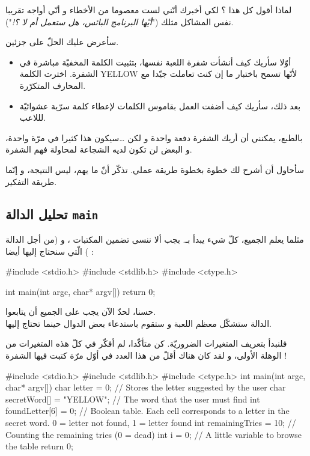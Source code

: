 لماذا أقول كل هذا ؟ لكي أخبرك أنّني لست معصوما من الأخطاء و أنّي أواجه تقريبا نفس المشاكل مثلك
("\textit{أيّها البرنامج البائس، هل ستعمل أم لا ؟!}").

سأعرض عليك الحلّ على جزئين.

\begin{itemize}
  \item أوّلا سأريك كيف أنشأت شفرة اللعبة نفسها، بتثبيت الكلمة المخفيّة مباشرة في الشفرة. اخترت الكلمة
\textenglish{YELLOW}
لأنّها تسمح باختبار ما إن كنت تعاملت جيّدا مع المحارف المتكرّرة.
  \item بعد ذلك، سأريك كيف أضفت العمل بقاموس الكلمات لإعطاء كلمة سرّية عشوائيّة لللاعب.
\end{itemize}

بالطبع، يمكنني أن أريك الشفرة دفعة واحدة و لكن \dots سيكون هذا كثيرا في مرّة واحدة، و البعض لن تكون لديه الشجاعة لمحاولة فهم الشفرة.

سأحاول أن أشرح لك خطوة بخطوة طريقة عملي. تذكّر أنّ ما يهم، ليس النتيجة، و إنّما طريقة التفكير.

\subsection{تحليل الدالة \texttt{main}}

مثلما يعلم الجميع، كلّ شيء يبدأ بـ.
بجب ألا ننسى تضمين المكتبات
،
و
(من أجل الدالة
)
الّتي سنحتاج إليها أيضا :

\begin{Csource}
#include <stdio.h>
#include <stdlib.h>
#include <ctype.h>

int main(int argc, char* argv[])
{
  return 0;
}
\end{Csource}

حسنا، لحدّ الآن يجب على الجميع أن يتابعوا.\\
الدالة
ستشكّل معظم اللعبة و ستقوم باستدعاء بعض الدوال حينما تحتاج إليها.

فلنبدأ بتعريف المتغيرات الضروريّة. كن متأكّدا، لم أفكّر في كلّ هذه المتغيرات من الوهلة الأولى، و لقد كان هناك أقلّ من هذا العدد في أوّل مرّة كتبت فيها الشفرة !

\begin{Csource}
#include <stdio.h>
#include <stdlib.h>
#include <ctype.h>
int main(int argc, char* argv[])
{
  char letter = 0; // Stores the letter suggested by the user
  char secretWord[] = "YELLOW"; // The word that the user must find
  int foundLetter[6] = {0}; // Boolean table. Each cell corresponds to a letter in the secret word. 0 = letter not found, 1 = letter found
  int remainingTries = 10; // Counting the remaining tries (0 = dead)
  int i = 0; // A little variable to browse the table
  return 0;
}
\end{Csource}

